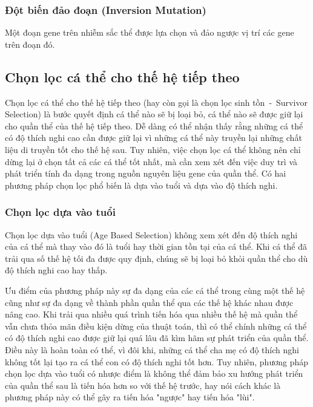 \subsubsection{Đột biến đảo đoạn (Inversion Mutation)}
Một đoạn gene trên nhiễm sắc thể được lựa chọn và đảo ngược vị trí các gene trên đoạn đó.



\subsection{Chọn lọc cá thể cho thế hệ tiếp theo} \label{chap_coso:sec_ga:subsec:luachonthehe} 
Chọn lọc cá thể cho thế hệ tiếp theo (hay còn gọi là chọn lọc sinh tồn~-~Survivor Selection) là bước quyết định cá thể nào sẽ bị loại bỏ, cá thể nào sẽ được giữ lại cho quần thể của thế hệ tiếp theo. Dễ dàng có thể nhận thấy rằng những cá thể có độ thích nghi cao cần được giữ lại vì những cá thể này truyền lại những chất liệu di truyền tốt cho thế hệ sau. Tuy nhiên, việc chọn lọc cá thể không nên chỉ dừng lại ở chọn tất cả các cá thể tốt nhất, mà cần xem xét đến việc duy trì và phát triển tính đa dạng trong nguồn nguyên liệu gene của quần thể. Có hai phương pháp chọn lọc phổ biến là dựa vào tuổi và dựa vào độ thích nghi.

\subsubsection{Chọn lọc dựa vào tuổi}
Chọn lọc dựa vào tuổi (Age Based Selection) không xem xét đến độ thích nghi của cá thể mà thay vào đó là tuổi hay thời gian tồn tại của cá thể. Khi cá thể đã trải qua số thế hệ tối đa được quy định, chúng sẽ bị loại bỏ khỏi quần thể cho dù độ thích nghi cao hay thấp.

Ưu điểm của phương pháp này sự đa dạng của các cá thể trong cùng một thế hệ cũng như sự đa dạng về thành phần quần thể qua các thế hệ khác nhau được nâng cao. Khi trải qua nhiều quá trình tiến hóa qua nhiều thế hệ mà quần thể vẫn chưa thỏa mãn điều kiện dừng của thuật toán, thì có thể chính những cá thể có độ thích nghi cao được giữ lại quá lâu đã kìm hãm sự phát triển của quần thể. Điều này là hoàn toàn có thể, vì đôi khi, những cá thể cha mẹ có độ thích nghi không tốt lại tạo ra cá thể con có độ thích nghi tốt hơn. 
Tuy nhiên, phương pháp chọn lọc dựa vào tuổi có nhược điểm là không thể đảm bảo xu hướng phát triển của quần thể sau là tiến hóa hơn so với thế hệ trước, hay nói cách khác là phương pháp này có thể gây ra tiến hóa "ngược" hay tiến hóa "lùi".

